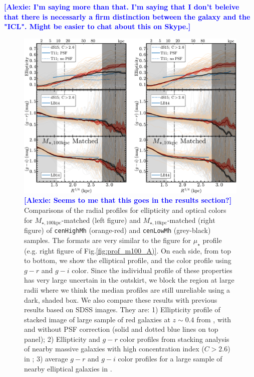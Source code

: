 \documentclass{emulateapj}
\def\rbcg{\texttt{cenHighMh}}
\def\nbcg{\texttt{cenLowMh}}
\def\minn{{$M_{\star,10\mathrm{kpc}}$}}
\def\mtot{{$M_{\star,100\mathrm{kpc}}$}}
\def\mden{{$\mu_{\star}$}}
\newcommand{\alexie}[1]{\textcolor{blue}{\textbf{[Alexie: #1]}}}
\begin{document}
\begin{CJK*}{UTF8}{gbsn}
    \alexie{I'm saying more than that. I'm saying that I don't beleive that there is necessarly a firm distinction between the galaxy and the "ICL". Might be easier to chat about this on Skype.}
 
  \begin{figure}[t!]
      \centering 
      \includegraphics[width=17.0cm]{fig/redbcg_discussion_2}
      \caption{\alexie{Seems to me that this goes in the results section?} Comparisons of the radial profiles for ellipticity and optical colors 
      	for \mtot{}-matched (left figure) and \minn{}-matched (right figure) of 
        \rbcg{} (orange-red) and \nbcg{} (grey-black) samples. 
        The formats are very similar to the figure for \mden{} profile 
        (e.g. right figure of Fig.\ref{fig:prof_m100_A)}. 
        On each side, from top to bottom, we show the elliptical profile, and the 
        color profile using $g-r$ and $g-i$ color. 
        Since the individual profile of these properties has very large uncertain in the 
        outskirt, we block the region at large radii where we think the median profiles 
        are still unreliable using a dark, shaded box.
        We also compare these results with previous results based on SDSS images. 
        They are: 
        1) Ellipticity profile of stacked image of large sample of red galaxies at 
        $z\sim 0.4$ from \citet{Tal2011}, with and without PSF correction 
        (solid and dotted blue lines on top panel); 
        2) Ellipticity and $g-r$ color profiles from stacking analysis of nearby massive 
        galaxies with high concentration index ($C>2.6$) in \citet[][blue dash lines 
        on the top and middle panels]{DSouza2014}; 
        3) average $g-r$ and $g-i$ color profiles for a large sample of nearby 
        elliptical galaxies in \citet[][blue, solid lines on the middle and bottom 
        panels]{LaBarbera2010}.}
      \label{fig:discussion_2}
  \end{figure}
   

\end{CJK*}
\end{document}
